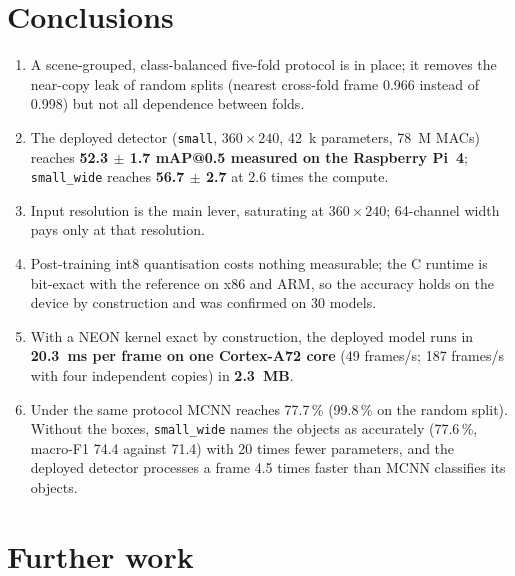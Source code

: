 \documentclass[11pt,a4paper]{article}
\newcommand{\cfg}[1]{\texttt{#1}}
\begin{document}
\section{Conclusions}

\begin{enumerate}
  \item A scene-grouped, class-balanced five-fold protocol is in place; it
        removes the near-copy leak of random splits (nearest cross-fold
        frame 0.966 instead of 0.998) but not all dependence between folds.
  \item The deployed detector (\cfg{small}, $360 \times 240$, 42~k
        parameters, 78~M MACs) reaches \textbf{52.3 $\pm$ 1.7 mAP@0.5
        measured on the Raspberry Pi~4}; \cfg{small\_wide} reaches
        \textbf{56.7 $\pm$ 2.7} at 2.6 times the compute.
  \item Input resolution is the main lever, saturating at
        $360 \times 240$; 64-channel width pays only at that resolution.
  \item Post-training int8 quantisation costs nothing measurable; the C
        runtime is bit-exact with the reference on x86 and ARM, so the
        accuracy holds on the device by construction and was confirmed on 30
        models.
  \item With a NEON kernel exact by construction, the deployed model runs
        in \textbf{20.3~ms per frame on one Cortex-A72 core} (49 frames/s;
        187 frames/s with four independent copies) in \textbf{2.3~MB}.
  \item Under the same protocol MCNN reaches 77.7\,\% (99.8\,\% on the
        random split). Without the boxes, \cfg{small\_wide} names the objects
        as accurately (77.6\,\%, macro-F1 74.4 against 71.4) with 20 times
        fewer parameters, and the deployed detector processes a frame 4.5
        times faster than MCNN classifies its objects.
\end{enumerate}

\section{Further work}
\label{sec:further}
\end{document}
